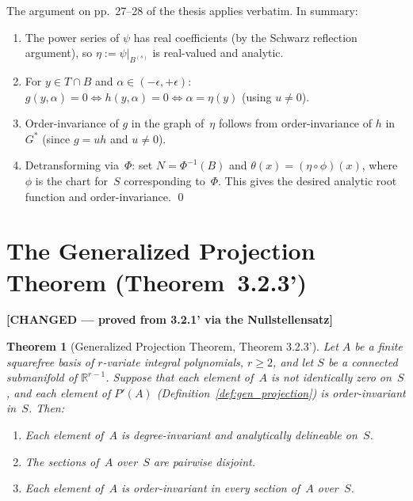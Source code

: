 \documentclass[11pt]{article}
\theoremstyle{plain}
\newtheorem{theorem}{Theorem}[section]
\theoremstyle{definition}
\newcommand{\R}{\mathbb{R}}
\begin{document}
The argument on pp.~27--28 of the thesis applies verbatim.  In summary:
\begin{enumerate}
\item The power series of $\psi$ has real coefficients (by the
  Schwarz reflection argument), so $\eta := \psi|_{B^{(s)}}$ is
  real-valued and analytic.
\item For $y \in T \cap B$ and $\alpha \in (-\epsilon, +\epsilon)$:
  $g(y, \alpha) = 0 \iff h(y, \alpha) = 0 \iff \alpha = \eta(y)$
  (using $u \ne 0$).
\item Order-invariance of $g$ in the graph of~$\eta$ follows from
  order-invariance of $h$ in $G^*$ (since $g = uh$ and $u \ne 0$).
\item Detransforming via~$\Phi$: set $N = \Phi^{-1}(B)$ and
  $\theta(x) = (\eta \circ \phi)(x)$, where $\phi$ is the chart for~$S$
  corresponding to~$\Phi$.  This gives the desired analytic root function
  and order-invariance.  \qed
\end{enumerate}

\section{The Generalized Projection Theorem (Theorem~3.2.3')}
\label{sec:projection}

\textbf{[CHANGED --- proved from 3.2.1' via the Nullstellensatz]}

\begin{theorem}[Generalized Projection Theorem, Theorem 3.2.3']
\label{thm:gen_projection}
Let $A$ be a finite squarefree basis of $r$-variate integral polynomials,
$r \ge 2$, and let $S$ be a connected submanifold of\/ $\R^{r-1}$.
Suppose that each element of~$A$ is not identically zero on~$S$, and
each element of $P'(A)$ (Definition~\ref{def:gen_projection}) is
order-invariant in~$S$.  Then:
\begin{enumerate}
\item Each element of~$A$ is degree-invariant and analytically delineable
  on~$S$.
\item The sections of~$A$ over~$S$ are pairwise disjoint.
\item Each element of~$A$ is order-invariant in every section of~$A$
  over~$S$.
\end{enumerate}
\end{theorem}
\end{document}
